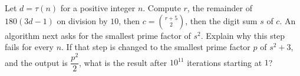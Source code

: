 Let $d=\tau(n)$ for a positive integer $n$. Compute $r$, the remainder of $180(3d-1)$ on division by $10$, then $c=\binom{r+5}{2}$, then the digit sum $s$ of $c$. An algorithm next asks for the smallest prime factor of $s^2$. Explain why this step fails for every $n$. If that step is changed to the smallest prime factor $p$ of $s^2+3$, and the output is $\dfrac{p^2}{2}$, what is the result after $10^{11}$ iterations starting at $1$?
